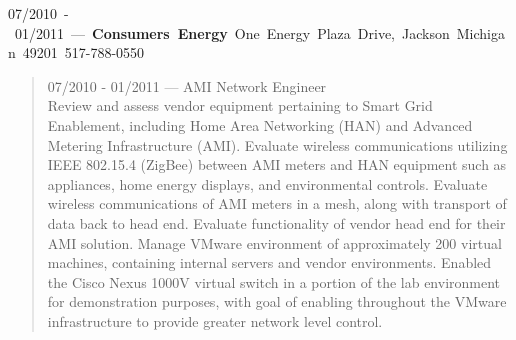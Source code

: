 \mbox{07/2010 - 01/2011 --- {\bf Consumers Energy} One Energy Plaza Drive, Jackson Michigan 49201 517-788-0550}
\begin{quote}
07/2010 - 01/2011 --- AMI Network Engineer\\
Review and assess vendor equipment pertaining to Smart Grid Enablement, including Home Area Networking (HAN) and Advanced Metering Infrastructure (AMI).  Evaluate wireless communications utilizing IEEE 802.15.4 (ZigBee) between AMI meters and HAN equipment such as appliances, home energy displays, and environmental controls.  Evaluate wireless communications of AMI meters in a mesh, along with transport of data back to head end.  Evaluate functionality of vendor head end for their AMI solution.  Manage VMware environment of approximately 200 virtual machines, containing internal servers and vendor environments.  Enabled the Cisco Nexus 1000V virtual switch in a portion of the lab environment for demonstration purposes, with goal of enabling throughout the VMware infrastructure to provide greater network level control.
\end{quote}
